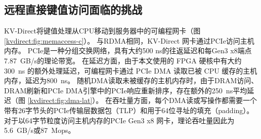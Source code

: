 \iffalse
\subsection{FPGA 可编程网卡}
\label{kvdirect:sec:programmable-nic}

十年前，处理器频率扩展速度放慢，人们转向多核和并发\cite {sutter2005free}。
如今，功率上限意味着多核扩展也遇到了困难\cite {esmaeilzadeh2013power}。
人们现在转向领域定制架构（DSA）以获得更好的性能。


由于网络速度和CPU网络处理能力的不匹配日益增加，带有FPGA的可编程网卡 \cite {vfp,greenberg2015sdn,li2016clicknp,caulfield2016cloud} 现在可以在数据中心进行大规模部署。
本文使用的可编程网卡的核心是FPGA，带有嵌入式网卡芯片以连接到网络。
可编程网卡通常带有板载DRAM作为数据包缓冲区和用于网卡固件的运行时内存\cite {li2016clicknp}，但DRAM通常不足以容纳整个键值存储。
\fi

\subsection{远程直接键值访问面临的挑战}
\label{kvdirect:sec:challenge}

KV-Direct将键值处理从CPU移动到服务器中的可编程网卡（图  \ref {kvdirect:fig:memaccess-c}）。
与RDMA相同，KV-Direct 网卡通过PCIe访问主机内存。 PCIe是一种分组交换网络，具有大约500 ns的往返延迟和每Gen3 x8端点7.87~GB/s的理论带宽。
在延迟方面，由于本文使用的 FPGA 硬核中有大约 300~ns 的额外处理延迟，可编程网卡通过 PCIe DMA 读取已被 CPU 缓存的主机内存，延迟为800~ns。
随机DMA读取未被缓存的主机内存时，由于DRAM访问、DRAM刷新和PCIe DMA引擎中的PCIe响应重新排序，存在额外的250~ns平均延迟（图 \ref {kvdirect:fig:dma-lat}）。
在吞吐量方面，每个DMA读或写操作都需要一个带有26字节头的PCIe传输层数据包（TLP）和用于64位寻址的填充（padding）。
对于以64字节粒度访问主机内存的PCIe Gen3 x8 网卡，理论吞吐量因此为5.6~GB/s或87~Mops。

